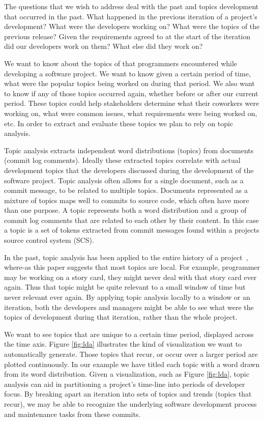 \documentclass[times, 10pt,twocolumn]{article}
\newcommand{\shrinkit}{\vspace*{-.3em}}
\begin{document}
\shrinkit
{}
\shrinkit


  The questions that we wish to address deal with the past and
  topics development that occurred in the past.  What happened in
  the previous iteration of a project's development?  What were the
  developers working on? What were the topics of the
  previous release? Given the requirements agreed to at the start of
  the iteration did our developers work on them?  What else did they
  work on?  

We want to know about the topics of that programmers
encountered while developing a software project. We want to know given
a certain period of time, what were the popular topics being worked on
during that period. We also want to know if any of those topics
occurred again, whether before or after our current period.  These
topics could help stakeholders determine what their coworkers were
working on, what were common issues, what requirements were being
worked on, etc. In order to extract and evaluate these topics we plan
to rely on topic analysis.



Topic analysis extracts independent word distributions (topics) from
documents (commit log comments).
Ideally these extracted topics 
correlate with actual development topics that the developers discussed
during the development of the software project. 
Topic analysis often allows for a single document, such as a commit
message, to be related to multiple topics. Documents represented as a mixture of topics maps well to commits
to source code, which often have more than one purpose.  A topic
represents both a word distribution and a group of commit log comments
that are related to each other by their content.  In this case a topic
is a set of tokens extracted from commit messages found within a
projects source control system (SCS). 

In the past, topic analysis has been applied to the entire history of a project~\cite{1321709,lukins2008,10.1109/ICPC.2007.13},
where-as this paper suggests that most topics are local. For example,  
programmer may be working on a story card, they might never deal with that
story card ever again. Thus that topic might be quite relevant to a
small window of time but never relevant ever again.  By applying topic
analysis locally to a window or an iteration, both the developers and managers
might be able to see what were the topics of development during that
iteration, rather than the whole project.


We want to see topics that are unique to a
certain time period, displayed across the time axis.
Figure \ref{fig:lda} illustrates the kind of visualization we want to
automatically generate. Those topics that
recur, or occur over a larger period are plotted continuously. In our
example we have titled each topic with a word drawn from its
word distribution.  
Given a visualization, such as Figure \ref{fig:lda}, topic
analysis can aid in partitioning a project's time-line into periods of
developer focus.
By breaking apart an iteration into sets of topics
and trends (topics that recur), we may be able to recognize the
underlying software development process and maintenance tasks from these
commits. 
\end{document}
